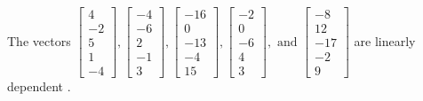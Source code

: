 \begin{exercise}
\begin{exerciseStatement}
  \end{exerciseStatement}
  \begin{exerciseAnswer}
   The vectors \(\left[\begin{array}{r}
4 \\
-2 \\
5 \\
1 \\
-4
\end{array}\right] , \left[\begin{array}{r}
-4 \\
-6 \\
2 \\
-1 \\
3
\end{array}\right] , \left[\begin{array}{r}
-16 \\
0 \\
-13 \\
-4 \\
15
\end{array}\right] , \left[\begin{array}{r}
-2 \\
0 \\
-6 \\
4 \\
3
\end{array}\right] , \text{ and } \left[\begin{array}{r}
-8 \\
12 \\
-17 \\
-2 \\
9
\end{array}\right]\) are 
  	 linearly dependent  .
  


  \end{exerciseAnswer}
\end{exercise}